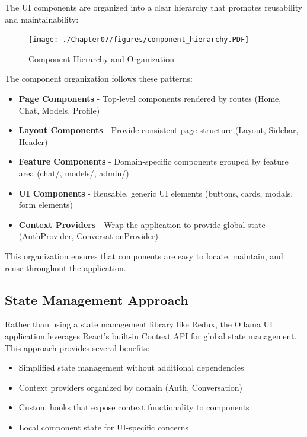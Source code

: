 The UI components are organized into a clear hierarchy that promotes reusability and maintainability:

\begin{figure}
    \centering
    \texttt{[image: ./Chapter07/figures/component\_hierarchy.PDF]}
    \caption{Component Hierarchy and Organization}
    \label{fig:component-hierarchy}
\end{figure}
\clearpage

The component organization follows these patterns:

\begin{itemize}
  \item \textbf{Page Components} - Top-level components rendered by routes (Home, Chat, Models, Profile)
  \item \textbf{Layout Components} - Provide consistent page structure (Layout, Sidebar, Header)
  \item \textbf{Feature Components} - Domain-specific components grouped by feature area (chat/, models/, admin/)
  \item \textbf{UI Components} - Reusable, generic UI elements (buttons, cards, modals, form elements)
  \item \textbf{Context Providers} - Wrap the application to provide global state (AuthProvider, ConversationProvider)
\end{itemize}

This organization ensures that components are easy to locate, maintain, and reuse throughout the application.

\subsection{State Management Approach}

Rather than using a state management library like Redux, the Ollama UI application leverages React's built-in Context API for global state management. This approach provides several benefits:

\begin{itemize}
  \item Simplified state management without additional dependencies
  \item Context providers organized by domain (Auth, Conversation)
  \item Custom hooks that expose context functionality to components
  \item Local component state for UI-specific concerns
\end{itemize}

